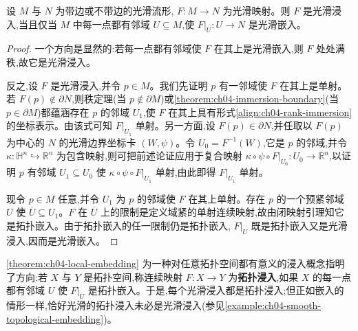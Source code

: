\documentclass[../../main.tex]{subfiles}
\begin{document}
\begin{theorem}\label{theorem:ch04-local-embedding}
设 $M$ 与 $N$ 为带边或不带边的光滑流形, $F:M\to N$ 为光滑映射。则 $F$ 是光滑浸入,当且仅当 $M$ 中每一点都有邻域 $U\subseteq M$,使 $F|_U:U\to N$ 是光滑嵌入。
\end{theorem}

\begin{proof}
一个方向是显然的:若每一点都有邻域使 $F$ 在其上是光滑嵌入,则 $F$ 处处满秩,故它是光滑浸入。

反之,设 $F$ 是光滑浸入,并令 $p\in M$。我们先证明 $p$ 有一邻域使 $F$ 在其上是单射。若 $F(p)\notin\partial N$,则秩定理(当 $p\notin\partial M$)或\cref{theorem:ch04-immersion-boundary}(当 $p\in\partial M$)都蕴涵存在 $p$ 的邻域 $U_1$,使 $F$ 在其上具有形式\eqref{align:ch04-rank-immersion} 的坐标表示。由该式可知 $F|_{U_1}$ 单射。另一方面,设 $F(p)\in\partial N$,并任取以 $F(p)$ 为中心的 $N$ 的光滑边界坐标卡 $(W,\psi)$。令 $U_0=F^{-1}(W)$,它是 $p$ 的邻域,并令 $\kappa:\mathbb{H}^n\hookrightarrow\mathbb{R}^n$ 为包含映射,则可把前述论证应用于复合映射 $\kappa\circ\psi\circ F|_{U_0}:U_0\to\mathbb{R}^n$,以证明 $p$ 有邻域 $U_1\subseteq U_0$ 使 $\kappa\circ\psi\circ F|_{U_1}$ 单射,由此即得 $F|_{U_1}$ 单射。

现令 $p\in M$ 任意,并令 $U_1$ 为 $p$ 的邻域使 $F$ 在其上单射。存在 $p$ 的一个预紧邻域 $U$ 使 $\overline{U}\subseteq U_1$。$F$ 在 $\overline{U}$ 上的限制是定义域紧的单射连续映射,故由闭映射引理知它是拓扑嵌入。由于拓扑嵌入的任一限制仍是拓扑嵌入, $F|_U$ 既是拓扑嵌入又是光滑浸入,因而是光滑嵌入。
\end{proof}

\cref{theorem:ch04-local-embedding} 为一种对任意拓扑空间都有意义的浸入概念指明了方向:若 $X$ 与 $Y$ 是拓扑空间,称连续映射 $F:X\to Y$ 为\textbf{拓扑浸入},如果 $X$ 的每一点都有邻域 $U$ 使 $F|_U$ 是拓扑嵌入。于是,每个光滑浸入都是拓扑浸入;但正如嵌入的情形一样,恰好光滑的拓扑浸入未必是光滑浸入(参见\cref{example:ch04-smooth-topological-embedding})。
\end{document}
